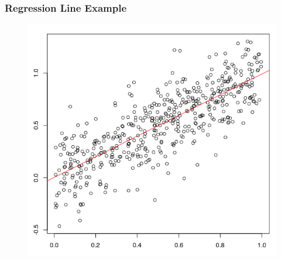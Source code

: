 \documentclass[xcolor=dvipsnames]{beamer}
\begin{document}
\begin{frame}
  \frametitle{Regression Line Example}
  \begin{figure}[h]
    \includegraphics[scale=0.4]{./diagrams/abline2.png}
  \end{figure}
\end{frame}
\end{document}
